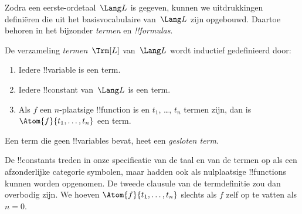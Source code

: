 \documentclass[../../../include/open-logic-section]{subfiles}
\begin{document}


Zodra een eerste-ordetaal~$\Lang L$ is gegeven, kunnen we uitdrukkingen
definiëren die uit het basisvocabulaire van~$\Lang L$ zijn opgebouwd.
Daartoe behoren in het bijzonder \emph{termen} en \emph{!!{formula}s}.

\begin{defn}[Termen]
De verzameling \emph{termen}~$\Trm[L]$ van~$\Lang L$ wordt inductief
gedefinieerd door:
\begin{enumerate}
\item Iedere !!{variable} is een term.
\item Iedere !!{constant} van~$\Lang L$ is een term.
\item Als $f$ een $n$-plaatsige !!{function} is en $t_1$, \dots, $t_n$
  termen zijn, dan is $\Atom{f}{t_1, \ldots, t_n}$ een term.
\end{enumerate}
Een term die geen !!{variable}s bevat, heet een \emph{gesloten term}.
\end{defn}

\begin{explain}
De !!{constant}s treden in onze specificatie van de taal en van de
termen op als een afzonderlijke categorie symbolen, maar hadden ook als
nulplaatsige !!{function}s kunnen worden opgenomen. De tweede clausule
van de termdefinitie zou dan overbodig zijn. We hoeven
$\Atom{f}{t_1, \ldots, t_n}$ slechts als $f$ zelf op te vatten als $n =
0$.
\end{explain}
\end{document}

